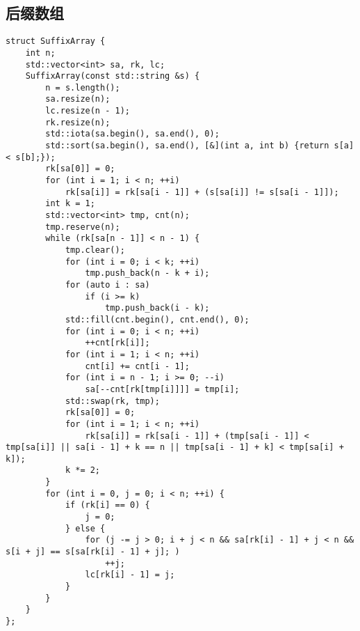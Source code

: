 \subsection{后缀数组}
\begin{lstlisting}
struct SuffixArray {
    int n;
    std::vector<int> sa, rk, lc;
    SuffixArray(const std::string &s) {
        n = s.length();
        sa.resize(n);
        lc.resize(n - 1);
        rk.resize(n);
        std::iota(sa.begin(), sa.end(), 0);
        std::sort(sa.begin(), sa.end(), [&](int a, int b) {return s[a] < s[b];});
        rk[sa[0]] = 0;
        for (int i = 1; i < n; ++i)
            rk[sa[i]] = rk[sa[i - 1]] + (s[sa[i]] != s[sa[i - 1]]);
        int k = 1;
        std::vector<int> tmp, cnt(n);
        tmp.reserve(n);
        while (rk[sa[n - 1]] < n - 1) {
            tmp.clear();
            for (int i = 0; i < k; ++i)
                tmp.push_back(n - k + i);
            for (auto i : sa)
                if (i >= k)
                    tmp.push_back(i - k);
            std::fill(cnt.begin(), cnt.end(), 0);
            for (int i = 0; i < n; ++i)
                ++cnt[rk[i]];
            for (int i = 1; i < n; ++i)
                cnt[i] += cnt[i - 1];
            for (int i = n - 1; i >= 0; --i)
                sa[--cnt[rk[tmp[i]]]] = tmp[i];
            std::swap(rk, tmp);
            rk[sa[0]] = 0;
            for (int i = 1; i < n; ++i)
                rk[sa[i]] = rk[sa[i - 1]] + (tmp[sa[i - 1]] < tmp[sa[i]] || sa[i - 1] + k == n || tmp[sa[i - 1] + k] < tmp[sa[i] + k]);
            k *= 2;
        }
        for (int i = 0, j = 0; i < n; ++i) {
            if (rk[i] == 0) {
                j = 0;
            } else {
                for (j -= j > 0; i + j < n && sa[rk[i] - 1] + j < n && s[i + j] == s[sa[rk[i] - 1] + j]; )
                    ++j;
                lc[rk[i] - 1] = j;
            }
        }
    }
};
\end{lstlisting}
